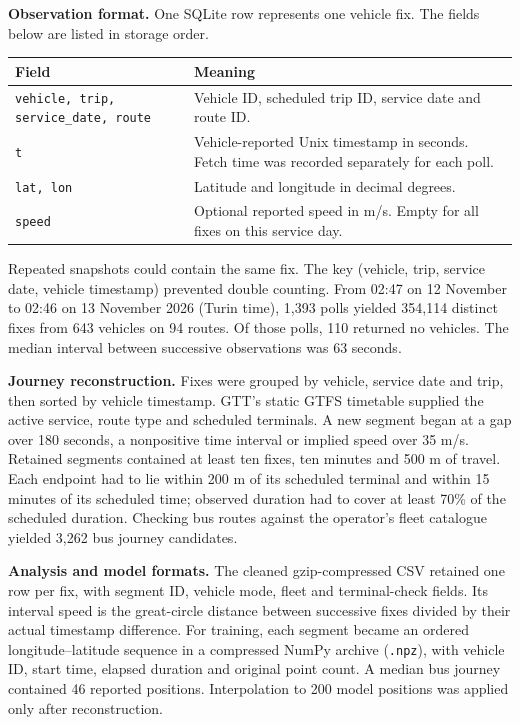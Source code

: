 \documentclass[11pt,a4paper]{article}
\begin{document}
\textbf{Observation format.} One SQLite row represents one vehicle fix. The fields below are listed in storage order.

\begin{center}\small
\begin{tabular}{lp{.54\linewidth}}\toprule
Field & Meaning\\\midrule
\texttt{vehicle, trip, service\_date, route} & Vehicle ID, scheduled trip ID, service date and route ID.\\
\texttt{t} & Vehicle-reported Unix timestamp in seconds. Fetch time was recorded separately for each poll.\\
\texttt{lat, lon} & Latitude and longitude in decimal degrees.\\
\texttt{speed} & Optional reported speed in m/s. Empty for all fixes on this service day.\\\bottomrule
\end{tabular}\end{center}
Repeated snapshots could contain the same fix. The key (vehicle, trip, service date, vehicle timestamp) prevented double counting. From 02:47 on 12 November to 02:46 on 13 November 2026 (Turin time), 1,393 polls yielded 354,114 distinct fixes from 643 vehicles on 94 routes. Of those polls, 110 returned no vehicles. The median interval between successive observations was 63 seconds.

\textbf{Journey reconstruction.} Fixes were grouped by vehicle, service date and trip, then sorted by vehicle timestamp. GTT's static GTFS timetable supplied the active service, route type and scheduled terminals. A new segment began at a gap over 180 seconds, a nonpositive time interval or implied speed over 35 m/s. Retained segments contained at least ten fixes, ten minutes and 500 m of travel. Each endpoint had to lie within 200 m of its scheduled terminal and within 15 minutes of its scheduled time; observed duration had to cover at least 70\% of the scheduled duration. Checking bus routes against the operator's fleet catalogue yielded 3,262 bus journey candidates.

\textbf{Analysis and model formats.} The cleaned gzip-compressed CSV retained one row per fix, with segment ID, vehicle mode, fleet and terminal-check fields. Its interval speed is the great-circle distance between successive fixes divided by their actual timestamp difference. For training, each segment became an ordered longitude--latitude sequence in a compressed NumPy archive (\texttt{.npz}), with vehicle ID, start time, elapsed duration and original point count. A median bus journey contained 46 reported positions. Interpolation to 200 model positions was applied only after reconstruction.
\end{document}
